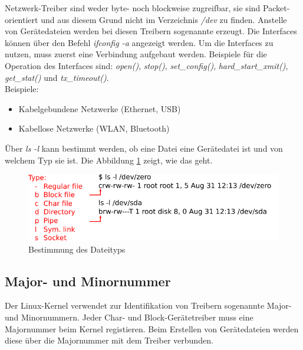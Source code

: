 \begin{description}[leftmargin=5cm]
   \item[Network Device Driver]
         Netzwerk-Treiber sind weder byte- noch blockweise zugreifbar, sie sind Packet-orientiert und aus diesem Grund nicht im Verzeichnis \emph{/dev} zu finden. Anstelle von Gerätedateien werden bei diesen Treibern 
         sogenannte  erzeugt. Die Interfaces können über den Befehl \emph{ifconfig -a} angezeigt werden. Um die Interfaces zu nutzen, muss zuerst eine Verbindung aufgebaut werden. Beispiele für 
         die Operation des Interfaces sind: \emph{open()}, \emph{stop()}, \emph{set\_config()}, \emph{hard\_start\_xmit()}, \emph{get\_stat()} und \emph{tx\_timeout()}. \\

         Beispiele:
         \begin{itemize}
            \item Kabelgebundene Netzwerke (Ethernet, USB)
            \item Kabellose Netzwerke (WLAN, Bluetooth)
         \end{itemize}
         
\end{description} \hfill

Über \emph{ls -l} kann bestimmt werden, ob eine Datei eine Gerätedatei ist und von welchem Typ sie ist. Die Abbildung \ref{fig:file_type} zeigt, wie das geht.
\clearpage
\begin{figure}[h!]
   \begin{center}
      \includegraphics{images/file_type}
   \end{center}
   \caption{Bestimmung des Dateityps}
   \label{fig:file_type}
\end{figure}

\subsection{Major- und Minornummer}

Der Linux-Kernel verwendet zur Identifikation von Treibern sogenannte Major- und Minornummern. Jeder Char- und Block-Gerätetreiber muss eine Majornummer beim Kernel registieren.
Beim Erstellen von Gerätedateien werden diese über die Majornummer mit dem Treiber verbunden. \\

